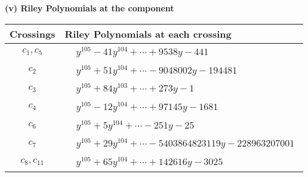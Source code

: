 \documentclass[1p]{elsarticle_modified}
\theoremstyle{definition}
\begin{document}
\newpage\renewcommand{\arraystretch}{1}
\flushleft \textbf{(v) Riley Polynomials at the component}\newline \\
\begin{tabular}{m{50pt}|m{274pt}}
Crossings & \hspace{64pt}Riley Polynomials at each crossing \\
\hline $$\begin{aligned}c_{1},c_{5}\end{aligned}$$&$\begin{aligned}
&y^{105}-41 y^{104}+\cdots+9538 y-441
\end{aligned}$\\
\hline $$\begin{aligned}c_{2}\end{aligned}$$&$\begin{aligned}
&y^{105}+51 y^{104}+\cdots-9048002 y-194481
\end{aligned}$\\
\hline $$\begin{aligned}c_{3}\end{aligned}$$&$\begin{aligned}
&y^{105}+84 y^{103}+\cdots+273 y-1
\end{aligned}$\\
\hline $$\begin{aligned}c_{4}\end{aligned}$$&$\begin{aligned}
&y^{105}-12 y^{104}+\cdots+97145 y-1681
\end{aligned}$\\
\hline $$\begin{aligned}c_{6}\end{aligned}$$&$\begin{aligned}
&y^{105}+5 y^{104}+\cdots-251 y-25
\end{aligned}$\\
\hline $$\begin{aligned}c_{7}\end{aligned}$$&$\begin{aligned}
&y^{105}+29 y^{104}+\cdots-5403864823119 y-228963207001
\end{aligned}$\\
\hline $$\begin{aligned}c_{8},c_{11}\end{aligned}$$&$\begin{aligned}
&y^{105}+65 y^{104}+\cdots+142616 y-3025
\end{aligned}$\\

\end{tabular}
\end{document}
